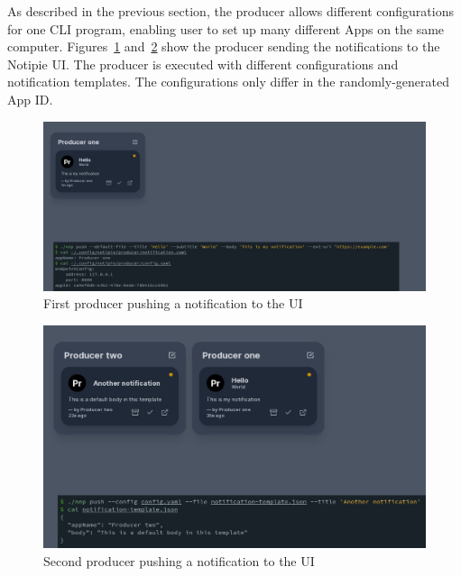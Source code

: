 As described in the previous section,
the producer allows different configurations
for one \ac{CLI} program,
enabling user to set up many different Apps
on the same computer.
Figures~\ref{fig:notipie-one-notification}
and~\ref{fig:notipie-two-notifications}
show the producer sending the notifications
to the Notipie \ac{UI}.
The producer is executed
with different configurations
and notification templates.
The configurations only differ
in the randomly-generated App \ac{ID}.

\begin{figure}[!p]
  \centering
  \includegraphics[width=\linewidth,keepaspectratio]{img/notipie_one_notification.jpg}
  \caption{First producer pushing a notification to the UI}
  \label{fig:notipie-one-notification}
\end{figure}

\begin{figure}[!p]
  \centering
  \includegraphics[width=\linewidth,keepaspectratio]{img/notipie_two_notifications.jpg}
  \caption{Second producer pushing a notification to the UI}
  \label{fig:notipie-two-notifications}
\end{figure}
